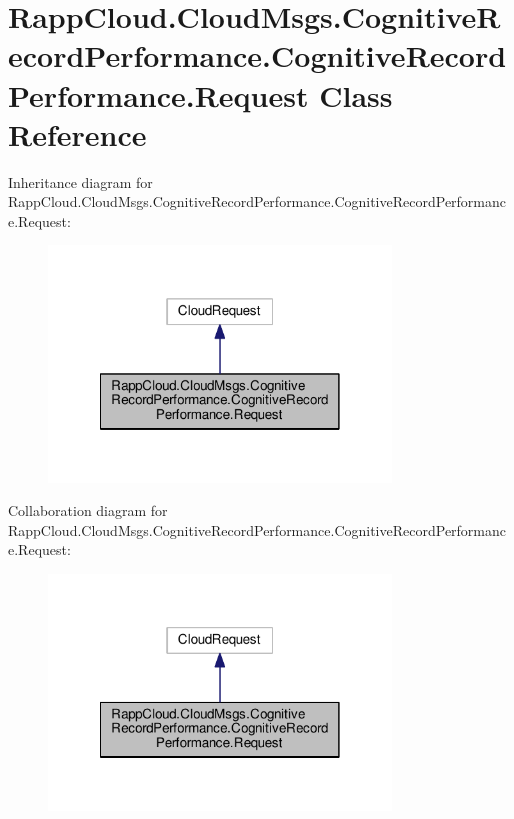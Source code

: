 \hypertarget{classRappCloud_1_1CloudMsgs_1_1CognitiveRecordPerformance_1_1CognitiveRecordPerformance_1_1Request}{\section{Rapp\-Cloud.\-Cloud\-Msgs.\-Cognitive\-Record\-Performance.\-Cognitive\-Record\-Performance.\-Request Class Reference}
\label{classRappCloud_1_1CloudMsgs_1_1CognitiveRecordPerformance_1_1CognitiveRecordPerformance_1_1Request}
}


Inheritance diagram for Rapp\-Cloud.\-Cloud\-Msgs.\-Cognitive\-Record\-Performance.\-Cognitive\-Record\-Performance.\-Request\-:
\nopagebreak
\begin{figure}[H]
\begin{center}
\leavevmode
\includegraphics[width=258pt]{classRappCloud_1_1CloudMsgs_1_1CognitiveRecordPerformance_1_1CognitiveRecordPerformance_1_1Request__inherit__graph}
\end{center}
\end{figure}


Collaboration diagram for Rapp\-Cloud.\-Cloud\-Msgs.\-Cognitive\-Record\-Performance.\-Cognitive\-Record\-Performance.\-Request\-:
\nopagebreak
\begin{figure}[H]
\begin{center}
\leavevmode
\includegraphics[width=258pt]{classRappCloud_1_1CloudMsgs_1_1CognitiveRecordPerformance_1_1CognitiveRecordPerformance_1_1Request__coll__graph}
\end{center}
\end{figure}

